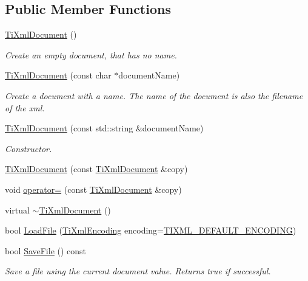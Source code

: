 \subsection*{Public Member Functions}
\begin{DoxyCompactItemize}
\item 
\hyperlink{class_ti_xml_document_a9f5e84335708fde98400230f9f12659c}{Ti\-Xml\-Document} ()
\begin{DoxyCompactList}\small\item\em Create an empty document, that has no name. \end{DoxyCompactList}\item 
\hyperlink{class_ti_xml_document_ae4508b452d0c3061db085f3db27b8396}{Ti\-Xml\-Document} (const char $\ast$document\-Name)
\begin{DoxyCompactList}\small\item\em Create a document with a name. The name of the document is also the filename of the xml. \end{DoxyCompactList}\item 
\hyperlink{class_ti_xml_document_a2c6e58fb99bfa76cc613f16840022225}{Ti\-Xml\-Document} (const std\-::string \&document\-Name)
\begin{DoxyCompactList}\small\item\em Constructor. \end{DoxyCompactList}\item 
\hyperlink{class_ti_xml_document_a323a7486e7da6099cdc19a5ff7e74b07}{Ti\-Xml\-Document} (const \hyperlink{class_ti_xml_document}{Ti\-Xml\-Document} \&copy)
\item 
void \hyperlink{class_ti_xml_document_aafbfacc3414008f619b1345775ef12a4}{operator=} (const \hyperlink{class_ti_xml_document}{Ti\-Xml\-Document} \&copy)
\item 
virtual \hyperlink{class_ti_xml_document_a1b8a035c2c2aab38e4387246a0b712c5}{$\sim$\-Ti\-Xml\-Document} ()
\item 
bool \hyperlink{class_ti_xml_document_a4c852a889c02cf251117fd1d9fe1845f}{Load\-File} (\hyperlink{tinyxml_8h_a88d51847a13ee0f4b4d320d03d2c4d96}{Ti\-Xml\-Encoding} encoding=\hyperlink{tinyxml_8h_ad5b8b092878e9010d6400cb6c13d4879}{T\-I\-X\-M\-L\-\_\-\-D\-E\-F\-A\-U\-L\-T\-\_\-\-E\-N\-C\-O\-D\-I\-N\-G})
\item 
bool \hyperlink{class_ti_xml_document_a21c0aeb0d0a720169ad4ac89523ebe93}{Save\-File} () const 
\begin{DoxyCompactList}\small\item\em Save a file using the current document value. Returns true if successful. \end{DoxyCompactList}\item 

\end{DoxyCompactItemize}
